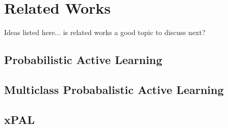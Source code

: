 \chapter{Related Works}

Ideas listed here... is related works a good topic to discuss next?

\section{Probabilistic Active Learning}

\section{Multiclass Probabalistic Active Learning}

\section{xPAL}
